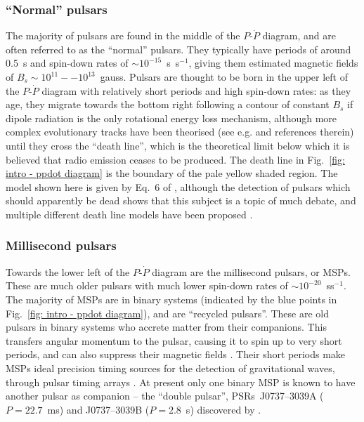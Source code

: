 \subsubsection*{``Normal'' pulsars}
\label{sec: intro - general intro - pulsar population - normal}

The majority of pulsars are found in the middle of the $P$-$\dot{P}$ diagram, and are often referred to as the ``normal'' pulsars. They typically have periods of around 0.5~s and spin-down rates of ${\sim}10^{-15}$~s~s$^{-1}$, giving them estimated magnetic fields of $B_s \sim 10^{11}--10^{13}$~gauss. Pulsars are thought to be born in the upper left of the $P$-$\dot{P}$ diagram with relatively short periods and high spin-down rates: as they age, they migrate towards the bottom right following a contour of constant $B_s$ if dipole radiation is the only rotational energy loss mechanism, although more complex evolutionary tracks have been theorised (see e.g. \citealt{JKxx2017} and references therein) until they cross the ``death line'', which is the theoretical limit below which it is believed that radio emission ceases to be produced. The death line in Fig.~\ref{fig: intro - ppdot diagram} is the boundary of the pale yellow shaded region. The model shown here is given by Eq.~6 of \citet{ZHMx2000}, although the detection of pulsars which should apparently be dead shows that this subject is a topic of much debate, and multiple different death line models have been proposed \citep[e.g.][]{CRxx1993,ZHMx2000, FKxx2006, JKxx2017, MBMA2020}.


\subsubsection*{Millisecond pulsars}
\label{sec: intro - general intro - pulsar population - MSPs}

Towards the lower left of the $P$-$\dot{P}$ diagram are the millisecond pulsars, or MSPs. These are much older pulsars with much lower spin-down rates of ${\sim}10^{-20}$~ss$^{-1}$. The majority of MSPs are in binary systems (indicated by the blue points in Fig.~\ref{fig: intro - ppdot diagram}), and are ``recycled pulsars''. These are old pulsars in binary systems who accrete matter from their companions. This transfers angular momentum to the pulsar, causing it to spin up to very short periods, and can also suppress their magnetic fields \citep{BKxx1974, SMSN1989}. Their short periods make MSPs ideal precision timing sources for the detection of gravitational waves, through pulsar timing arrays \citep[e.g][]{FBxx1990,MHB+2013}. At present only one binary MSP is known to have another pulsar as companion -- the ``double pulsar'', PSRs~J0737–3039A ($P=22.7$~ms) and J0737–3039B ($P=2.8$~s) discovered by \citet{BDP+2003}.


